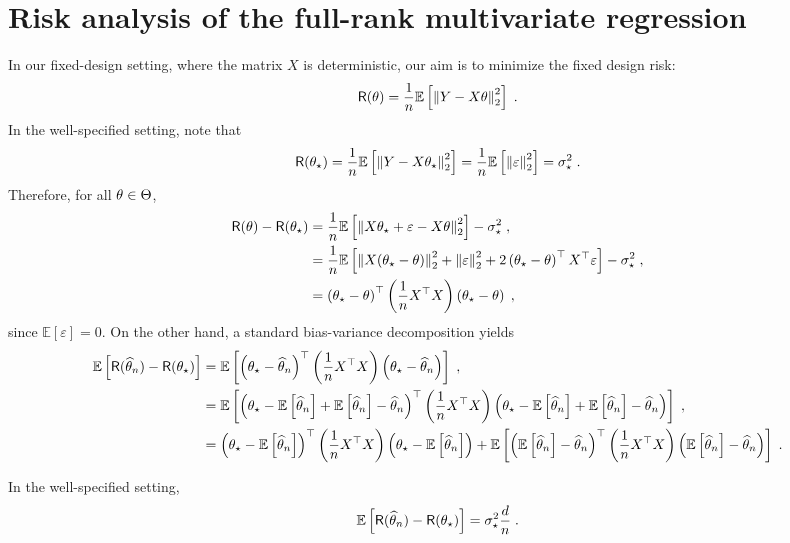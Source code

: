 \section{Risk analysis of the full-rank multivariate regression}
In our fixed-design setting, where the matrix $X$ is deterministic, our aim is to minimize the fixed design risk:
$$
\mathsf{R}(\theta) = \frac{1}{n}\mathbb{E}\left[\left\|Y - X\theta\right\|_2^2\right]\;.
$$
In the well-specified setting, note that
$$
\mathsf{R}(\theta_\star) = \frac{1}{n}\mathbb{E}\left[\left\|Y - X\theta_\star\right\|_2^2\right]= \frac{1}{n}\mathbb{E}\left[\left\|\varepsilon\right\|_2^2\right] = \sigma_\star^2\;.
$$
Therefore, for all $\theta\in\Theta$,
\begin{align*}
\mathsf{R}(\theta) - \mathsf{R}(\theta_\star) &=    \frac{1}{n}\mathbb{E}\left[\left\|X\theta_\star + \varepsilon - X\theta\right\|_2^2\right] - \sigma_\star^2\;,\\
&=  \frac{1}{n}\mathbb{E}\left[\left\|X(\theta_\star-\theta)\right\|_2^2 + \left\|\varepsilon\right\|_2^2 + 2 \left(\theta_\star-\theta\right)^\top X^\top \varepsilon\right] - \sigma_\star^2\;,\\
&= \left(\theta_\star-\theta\right)^\top \left(\frac{1}{n}X^\top X\right) \left(\theta_\star-\theta\right)\;,
\end{align*}
since $\mathbb{E}[\varepsilon] = 0$. On the other hand, a standard bias-variance decomposition yields
\begin{align*}
\mathbb{E}\left[\mathsf{R}(\widehat {\theta}_n) - \mathsf{R}(\theta_\star)\right] &=  \mathbb{E}\left[ \left(\theta_\star-\widehat {\theta}_n\right)^\top \left(\frac{1}{n}X^\top X\right) \left(\theta_\star-\widehat {\theta}_n\right)\right]\;,\\
&=  \mathbb{E}\left[ \left(\theta_\star-\mathbb{E}\left[\widehat {\theta}_n\right] + \mathbb{E}\left[\widehat {\theta}_n\right] - \widehat {\theta}_n\right)^\top \left(\frac{1}{n}X^\top X\right) \left(\theta_\star-\mathbb{E}\left[\widehat {\theta}_n\right] + \mathbb{E}\left[\widehat {\theta}_n\right] - \widehat {\theta}_n\right)\right]\;,\\
&=\left(\theta_\star-\mathbb{E}\left[\widehat {\theta}_n\right]\right)^\top \left(\frac{1}{n}X^\top X\right) \left(\theta_\star-\mathbb{E}\left[\widehat {\theta}_n\right] \right) + \mathbb{E}\left[ \left(\mathbb{E}\left[\widehat {\theta}_n\right] - \widehat {\theta}_n\right)^\top \left(\frac{1}{n}X^\top X\right) \left(\mathbb{E}\left[\widehat {\theta}_n\right] - \widehat {\theta}_n\right)\right]\;.
\end{align*}


\begin{proposition}
In the well-specified setting, 
$$
\mathbb{E}\left[\mathsf{R}(\widehat {\theta}_n) - \mathsf{R}(\theta_\star)\right] = \sigma_\star^2 \frac{d}{n}\;.
$$
\end{proposition}


